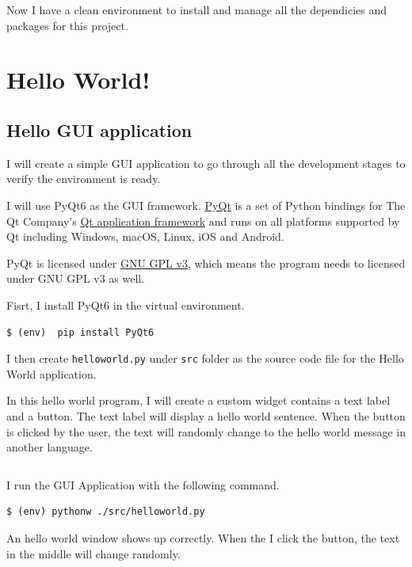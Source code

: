 \documentclass[a4paper]{report}
\begin{document}
Now I have a clean environment to install and manage all the dependicies and packages for this project.

\section{Hello World!}

\subsection{Hello GUI application}

I will create a simple GUI application to go through all the development stages to verify the environment is ready.

I will use PyQt6 as the GUI framework. \href{https://riverbankcomputing.com/software/pyqt}{PyQt} is a set of Python bindings for The Qt Company's \href{https://www.qt.io/}{Qt application framework} and runs on all platforms supported by Qt including Windows, macOS, Linux, iOS and Android.

PyQt is licensed under \href{https://www.gnu.org/licenses/gpl-3.0.en.html}{GNU GPL v3}, which means the program needs to licensed under GNU GPL v3 as well.

Fisrt, I install PyQt6 in the virtual environment.

\begin{verbatim}
$ (env)  pip install PyQt6
\end{verbatim}

I then create \texttt{helloworld.py} under \texttt{src} folder as the source code file for the Hello World application.

In this hello world program, I will create a custom widget contains a text label and a button. The text label will display a hello world sentence. When the button is clicked by the user, the text will randomly change to the hello world message in another language.

\inputminted{python}{../src/helloworld.py}

I run the GUI Application with the following command.

\begin{verbatim}
$ (env) pythonw ./src/helloworld.py
\end{verbatim}

An hello world window shows up correctly. When the I click the  button, the text in the middle will change randomly.
\end{document}

